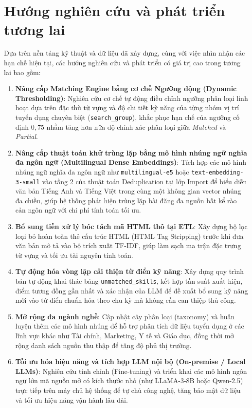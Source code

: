 
\section{Hướng nghiên cứu và phát triển tương lai}

Dựa trên nền tảng kỹ thuật và dữ liệu đã xây dựng, cùng với việc nhìn nhận các hạn chế hiện tại, các hướng nghiên cứu và phát triển có giá trị cao trong tương lai bao gồm:

\begin{enumerate}
    \item \textbf{Nâng cấp Matching Engine bằng cơ chế Ngưỡng động (Dynamic Thresholding)}: Nghiên cứu cơ chế tự động điều chỉnh ngưỡng phân loại linh hoạt dựa trên đặc thù từ vựng và độ chi tiết kỹ năng của từng nhóm vị trí tuyển dụng chuyên biệt (\texttt{search\_group}), khắc phục hạn chế của ngưỡng cố định $0{,}75$ nhằm tăng hơn nữa độ chính xác phân loại giữa \textit{Matched} và \textit{Partial}.

    \item \textbf{Nâng cấp thuật toán khử trùng lặp bằng mô hình nhúng ngữ nghĩa đa ngôn ngữ (Multilingual Dense Embeddings)}: Tích hợp các mô hình nhúng ngữ nghĩa đa ngôn ngữ như \texttt{multilingual-e5} hoặc \texttt{text-embedding-3-small} vào tầng 2 của thuật toán Deduplication tại lớp Import để biểu diễn văn bản Tiếng Anh và Tiếng Việt trong cùng một không gian vector nhúng đa chiều, giúp hệ thống phát hiện trùng lặp bài đăng đa nguồn bất kể rào cản ngôn ngữ với chi phí tính toán tối ưu.

    \item \textbf{Bổ sung tiền xử lý bóc tách mã HTML thô tại ETL}: Xây dựng bộ lọc loại bỏ hoàn toàn thẻ cấu trúc HTML (HTML Tag Stripping) trước khi đưa văn bản mô tả vào bộ trích xuất TF-IDF, giúp làm sạch ma trận đặc trưng từ vựng và tối ưu tài nguyên tính toán.

    \item \textbf{Tự động hóa vòng lặp cải thiện từ điển kỹ năng}: Xây dựng quy trình bán tự động khai thác bảng \texttt{unmatched\_skills}, kết hợp tần suất xuất hiện, điểm tương đồng gần nhất và xác nhận của LLM để đề xuất bổ sung kỹ năng mới vào từ điển chuẩn hóa theo chu kỳ mà không cần can thiệp thủ công.

    \item \textbf{Mở rộng đa ngành nghề}: Cập nhật cây phân loại (taxonomy) và huấn luyện thêm các mô hình nhúng để hỗ trợ phân tích dữ liệu tuyển dụng ở các lĩnh vực khác như Tài chính, Marketing, Y tế và Giáo dục, đồng thời mở rộng danh sách nguồn thu thập để tăng độ phủ thị trường.

    \item \textbf{Tối ưu hóa hiệu năng và tích hợp LLM nội bộ (On-premise / Local LLMs)}: Nghiên cứu tinh chỉnh (Fine-tuning) và triển khai các mô hình ngôn ngữ lớn mã nguồn mở có kích thước nhỏ (như LLaMA-3-8B hoặc Qwen-2.5) trực tiếp trên máy chủ hệ thống để tự chủ công nghệ, tăng bảo mật dữ liệu và tối ưu hiệu năng vận hành lâu dài.
\end{enumerate}

